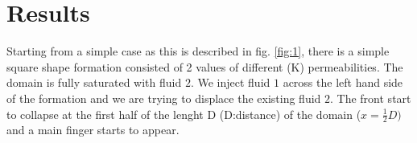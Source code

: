 \documentclass[preprint,authoryear,12pt]{elsarticle}
\begin{document}
 

\pagebreak
\clearpage

\pagebreak
\clearpage
%
%

\section{Results}\label{section:results}

Starting from a simple case as this is described in fig. \ref{fig:1}, there is a simple square shape formation consisted of 2 values of different (K) permeabilities. The domain is fully saturated with fluid $2$. We inject fluid $1$ across the left hand side of the formation and we are trying to displace the existing fluid $2$. The front start to collapse at the first half of the lenght D (D:distance) of the domain ($x= \frac{1}{2} D)$ and a main finger starts to appear.
\end{document}
